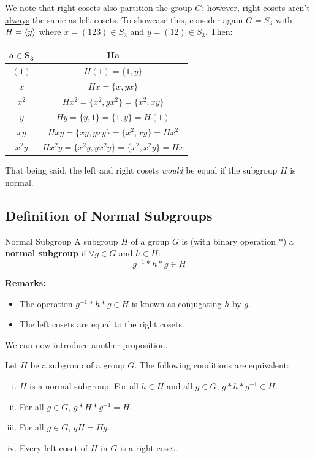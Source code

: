 \documentclass[letterpaper]{article}
\begin{document}
We note that right cosets also partition the group $G$; however, right cosets \underline{aren't always} the same as left cosets. To showcase this, consider again $G = S_3$ with $H = \langle y \rangle$ where $x = (123) \in S_3$ and $y = (12) \in S_3$. Then:
\begin{center}
    \begin{tabular}{c|c}
        $\mathbf{a \in S_3}$ & $\mathbf{Ha}$ \\ 
        \hline 
        $(1)$       & $H(1) = \{1, y\}$ \\ 
        $x$         & $Hx = \{x, yx\}$ \\ 
        $x^2$       & $Hx^2 = \{x^2, yx^2\} = \{x^2, xy\}$ \\ 
        $y$         & $Hy = \{y, 1\} = \{1, y\} = H(1)$ \\ 
        $xy$        & $Hxy = \{xy, yxy\} = \{x^2, xy\} = Hx^2$ \\ 
        $x^2 y$     & $Hx^2 y = \{x^2 y, yx^2 y\} = \{x^2, x^2 y\} = Hx$
    \end{tabular}
\end{center}
That being said, the left and right cosets \emph{would} be equal if the subgroup $H$ is normal.


\subsection{Definition of Normal Subgroups}
\begin{definition}{Normal Subgroup}{}
    A subgroup $H$ of a group $G$ is (with binary operation $*$) a \textbf{normal subgroup} if $\forall g \in G$ and $h \in H$: 
    \[g^{-1} * h * g \in H\]
\end{definition}
\textbf{Remarks:}
\begin{itemize}
    \item The operation $g^{-1} * h * g \in H$ is known as conjugating $h$ by $g$. 
    \item The left cosets are equal to the right cosets. 
\end{itemize}
We can now introduce another proposition. 
\begin{mdframed}
    \begin{proposition}
        Let $H$ be a subgroup of a group $G$. The following conditions are equivalent: 
        \begin{enumerate}[(i)]
            \item $H$ is a normal subgroup. For all $h \in H$ and all $g \in G$, $g * h * g^{-1} \in H$. 
            \item For all $g \in G$, $g * H * g^{-1} = H$. 
            \item For all $g \in G$, $gH = Hg$. 
            \item Every left coset of $H$ in $G$ is a right coset. 
        \end{enumerate}
    \end{proposition}
\end{mdframed}
\end{document}
